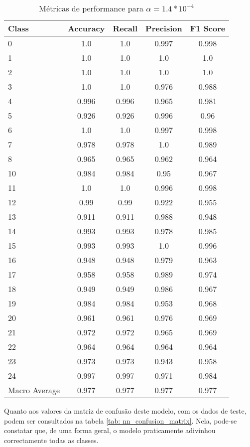 \begin{table}[!t]
\caption{Métricas de performance para $\alpha = 1.4 * 10^{-4}$}
\begin{center}
\begin{tabular}{l c c c c}
Class & Accuracy & Recall & Precision & F1 Score\\ \hline
0 & 1.0 & 1.0 & 0.997 & 0.998\\
1 & 1.0 & 1.0 & 1.0 & 1.0\\
2 & 1.0 & 1.0 & 1.0 & 1.0\\
3 & 1.0 & 1.0 & 0.976 & 0.988\\
4 & 0.996 & 0.996 & 0.965 & 0.981\\
5 & 0.926 & 0.926 & 0.996 & 0.96\\
6 & 1.0 & 1.0 & 0.997 & 0.998\\
7 & 0.978 & 0.978 & 1.0 & 0.989\\
8 & 0.965 & 0.965 & 0.962 & 0.964\\
10 & 0.984 & 0.984 & 0.95 & 0.967\\
11 & 1.0 & 1.0 & 0.996 & 0.998\\
12 & 0.99 & 0.99 & 0.922 & 0.955\\
13 & 0.911 & 0.911 & 0.988 & 0.948\\
14 & 0.993 & 0.993 & 0.978 & 0.985\\
15 & 0.993 & 0.993 & 1.0 & 0.996\\
16 & 0.948 & 0.948 & 0.979 & 0.963\\
17 & 0.958 & 0.958 & 0.989 & 0.974\\
18 & 0.949 & 0.949 & 0.986 & 0.967\\
19 & 0.984 & 0.984 & 0.953 & 0.968\\
20 & 0.961 & 0.961 & 0.976 & 0.969\\
21 & 0.972 & 0.972 & 0.965 & 0.969\\
22 & 0.964 & 0.964 & 0.964 & 0.964\\
23 & 0.973 & 0.973 & 0.943 & 0.958\\
24 & 0.997 & 0.997 & 0.971 & 0.984\\
\hline
Macro Average & 0.977 & 0.977 & 0.977 & 0.977\\
\end{tabular}
\label{tab: nn_perforamnce}
\end{center}
\end{table}

Quanto aos valores da matriz de confusão deste modelo, com os dados de teste, podem ser consultados na tabela \ref{tab: nn_confusion_matrix}. Nela, pode-se constatar que, de uma forma geral, o modelo praticamente adivinhou correctamente todas as classes.

